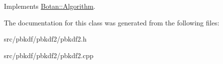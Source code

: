Implements \hyperlink{classBotan_1_1Algorithm_a42d3ee39e051eba01ecace201fe1e6fd}{Botan\-::\-Algorithm}.



The documentation for this class was generated from the following files\-:\begin{DoxyCompactItemize}
\item 
src/pbkdf/pbkdf2/pbkdf2.\-h\item 
src/pbkdf/pbkdf2/pbkdf2.\-cpp\end{DoxyCompactItemize}
